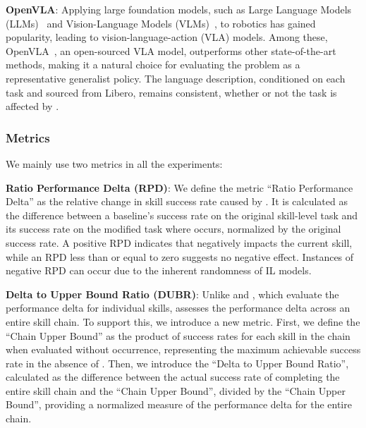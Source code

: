 \textbf{OpenVLA}: Applying large foundation models, such as Large Language Models (LLMs)~\cite{openai2024chatgpt} and Vision-Language Models (VLMs)~\cite{dubey2024llama}, to robotics has gained popularity, leading to vision-language-action (VLA) models. Among these, OpenVLA~\cite{kim2024openvla}, an open-sourced VLA model, outperforms other state-of-the-art methods, making it a natural choice for evaluating the \pb problem as a representative generalist policy. The language description, conditioned on each task and sourced from Libero, remains consistent, whether or not the task is affected by \pb.


\subsubsection{Metrics}
We mainly use two metrics in all the experiments: 

\textbf{Ratio Performance Delta (RPD)}: We define the metric ``Ratio Performance Delta'' as the relative change in skill success rate caused by \pb. It is calculated as the difference between a baseline's success rate on the original skill-level task and its success rate on the modified task where \pb occurs, normalized by the original success rate. A positive RPD indicates that \pb negatively impacts the current skill, while an RPD less than or equal to zero suggests no negative effect. Instances of negative RPD can occur due to the inherent randomness of IL models.

\textbf{Delta to Upper Bound Ratio (DUBR)}: Unlike \bma and \bmb, which evaluate the performance delta for individual skills, \bmc assesses the performance delta across an entire skill chain. To support this, we introduce a new metric. First, we define the ``Chain Upper Bound'' as the product of success rates for each skill in the chain when evaluated without \pb occurrence, representing the maximum achievable success rate in the absence of \pb. Then, we introduce the ``Delta to Upper Bound Ratio'', calculated as the difference between the actual success rate of completing the entire skill chain and the ``Chain Upper Bound'', divided by the ``Chain Upper Bound'', providing a normalized measure of the performance delta for the entire chain.


